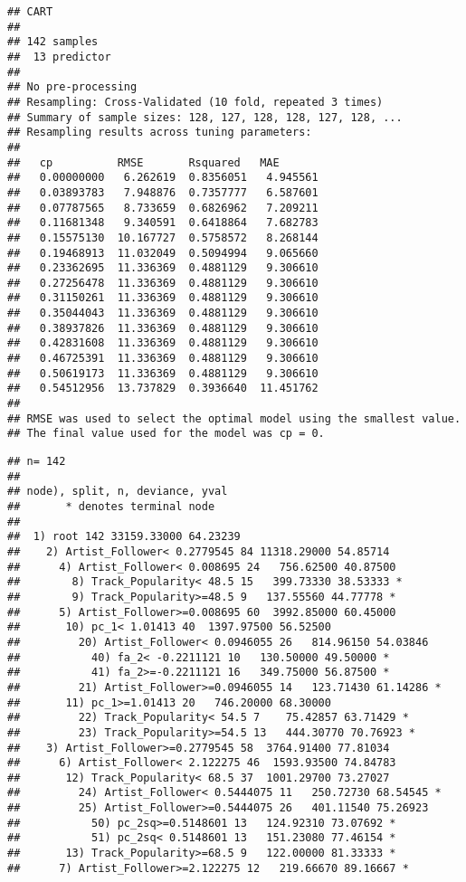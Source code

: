 \documentclass[
]{article}
\newenvironment{Shaded}{\begin{snugshade}}{\end{snugshade}}
\newcommand{\NormalTok}[1]{#1}
\newcommand{\OperatorTok}[1]{\textcolor[rgb]{0.81,0.36,0.00}{\textbf{#1}}}
\newcommand{\StringTok}[1]{\textcolor[rgb]{0.31,0.60,0.02}{#1}}
\begin{document}
\begin{verbatim}
## CART 
## 
## 142 samples
##  13 predictor
## 
## No pre-processing
## Resampling: Cross-Validated (10 fold, repeated 3 times) 
## Summary of sample sizes: 128, 127, 128, 128, 127, 128, ... 
## Resampling results across tuning parameters:
## 
##   cp          RMSE       Rsquared   MAE      
##   0.00000000   6.262619  0.8356051   4.945561
##   0.03893783   7.948876  0.7357777   6.587601
##   0.07787565   8.733659  0.6826962   7.209211
##   0.11681348   9.340591  0.6418864   7.682783
##   0.15575130  10.167727  0.5758572   8.268144
##   0.19468913  11.032049  0.5094994   9.065660
##   0.23362695  11.336369  0.4881129   9.306610
##   0.27256478  11.336369  0.4881129   9.306610
##   0.31150261  11.336369  0.4881129   9.306610
##   0.35044043  11.336369  0.4881129   9.306610
##   0.38937826  11.336369  0.4881129   9.306610
##   0.42831608  11.336369  0.4881129   9.306610
##   0.46725391  11.336369  0.4881129   9.306610
##   0.50619173  11.336369  0.4881129   9.306610
##   0.54512956  13.737829  0.3936640  11.451762
## 
## RMSE was used to select the optimal model using the smallest value.
## The final value used for the model was cp = 0.
\end{verbatim}

\begin{Shaded}
\end{Shaded}

\begin{verbatim}
## n= 142 
## 
## node), split, n, deviance, yval
##       * denotes terminal node
## 
##  1) root 142 33159.33000 64.23239  
##    2) Artist_Follower< 0.2779545 84 11318.29000 54.85714  
##      4) Artist_Follower< 0.008695 24   756.62500 40.87500  
##        8) Track_Popularity< 48.5 15   399.73330 38.53333 *
##        9) Track_Popularity>=48.5 9   137.55560 44.77778 *
##      5) Artist_Follower>=0.008695 60  3992.85000 60.45000  
##       10) pc_1< 1.01413 40  1397.97500 56.52500  
##         20) Artist_Follower< 0.0946055 26   814.96150 54.03846  
##           40) fa_2< -0.2211121 10   130.50000 49.50000 *
##           41) fa_2>=-0.2211121 16   349.75000 56.87500 *
##         21) Artist_Follower>=0.0946055 14   123.71430 61.14286 *
##       11) pc_1>=1.01413 20   746.20000 68.30000  
##         22) Track_Popularity< 54.5 7    75.42857 63.71429 *
##         23) Track_Popularity>=54.5 13   444.30770 70.76923 *
##    3) Artist_Follower>=0.2779545 58  3764.91400 77.81034  
##      6) Artist_Follower< 2.122275 46  1593.93500 74.84783  
##       12) Track_Popularity< 68.5 37  1001.29700 73.27027  
##         24) Artist_Follower< 0.5444075 11   250.72730 68.54545 *
##         25) Artist_Follower>=0.5444075 26   401.11540 75.26923  
##           50) pc_2sq>=0.5148601 13   124.92310 73.07692 *
##           51) pc_2sq< 0.5148601 13   151.23080 77.46154 *
##       13) Track_Popularity>=68.5 9   122.00000 81.33333 *
##      7) Artist_Follower>=2.122275 12   219.66670 89.16667 *
\end{verbatim}
\end{document}

